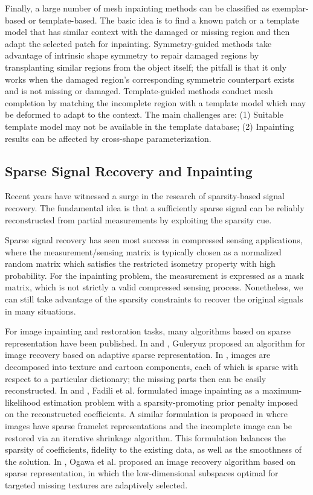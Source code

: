 Finally, a large number of mesh inpainting methods can be classified as
exemplar-based or template-based. The basic idea is to find a known patch or a
template model that has similar context with the damaged or missing region and then
adapt the selected patch for inpainting. Symmetry-guided methods
\cite{PaulyMitraWallnerEtAl2008, Sharf2004, Park2005, LiYinWeiEtAl2011}
take advantage of intrinsic shape symmetry to repair damaged regions by
transplanting similar regions from the object itself; the pitfall is that it
only works when the damaged region's corresponding symmetric counterpart exists
and is not missing or damaged. Template-guided methods \cite{Kraevoy2005, GalShamirHassnerEtAl2007, ZhangYuManheinEtAl2015, WeiYuLiEtAl2011,Pauly2005}
conduct mesh completion by matching the incomplete region with a template model
which may be deformed to adapt to the context. The main challenges are:
(1) Suitable template model may not be available in the template database;
(2) Inpainting results can be affected by cross-shape parameterization.

\subsection{Sparse Signal Recovery and Inpainting}

Recent years have witnessed a surge in the research of sparsity-based
signal recovery. The fundamental idea is that a sufficiently sparse
signal can be reliably reconstructed from partial measurements by
exploiting the sparsity cue.

Sparse signal recovery has seen most success in compressed sensing
applications, where the measurement/sensing matrix is typically chosen
as a normalized random matrix which satisfies the restricted isometry
property with high probability. For the inpainting problem, the
measurement is expressed as a mask matrix, which is not strictly a
valid compressed sensing process. Nonetheless, we can still take
advantage of the sparsity constraints to recover the original signals
in many situations.

For image inpainting and restoration tasks, many algorithms based on
 sparse representation have been published. In \cite{Guleryuz2006} and
\cite{Guleryuz2006a}, Guleryuz proposed an algorithm for image
recovery based on adaptive sparse representation. In \cite{Elad2005},
images are decomposed into texture and cartoon components, each of
which is sparse with respect to a particular dictionary; the missing
parts then can be easily reconstructed. In \cite{Fadili2005} and
\cite{Fadili2009}, Fadili et al. formulated image inpainting as a
maximum-likelihood estimation problem with a sparsity-promoting prior
penalty imposed on the reconstructed coefficients. A similar
formulation is proposed in \cite{Cai2008} where images have sparse
framelet representations and the incomplete image can be restored via
an iterative shrinkage algorithm. This formulation balances the
sparsity of coefficients, fidelity to the existing data, as well as
the smoothness of the solution. In \cite{Ogawa2011}, Ogawa et al.
proposed an image recovery algorithm based on sparse representation,
in which the low-dimensional subspaces optimal for targeted missing
textures are adaptively selected.

